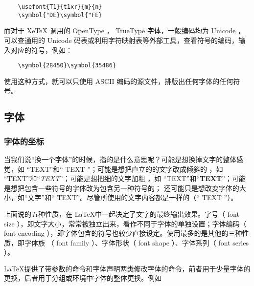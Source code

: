 \begin{minipage}[t]{0.45\textwidth}
\begin{lstlisting}
    \usefont{T1}{t1xr}{m}{n}
    \symbol{"DE}\symbol{"FE}
\end{lstlisting}
\end{minipage}
\hfill
\begin{minipage}[t]{0.45\textwidth}
\end{minipage}

而对于 XeTeX 调用的 OpenType ， TrueType 字体，一般编码均为 Unicode ，可以查通用的 Unicode 码表或利用字符映射表等外部工具，查看符号的编码，输入对应的符号，例如：

\begin{minipage}[t]{0.45\textwidth}
\begin{lstlisting}
    \symbol{28450}\symbol{35486}
\end{lstlisting}
\end{minipage}
\hfill
\begin{minipage}[t]{0.45\textwidth}
\end{minipage}

使用这种方式，就可以只使用 ASCII 编码的源文件，排版出任何字体的任何符号。

\subsection{字体}

\subsubsection{字体的坐标} \label{sec:font}

当我们说“换一个字体”的时候，指的是什么意思呢？可能是想换掉文字的整体感觉，如 “{\ttfamily TEXT}”和“ {\sffamily TEXT} ”；可能是想把直立的的文字改成倾斜的 ，如 “TEXT”和“\textit{TEXT}”；可能是想把细的文字加粗 ，如 “TEXT”和“\textbf{TEXT}”；可能是想把包含一些符号的字体改为包含另一种符号的； 还可能只是想改变字体的大小，如“文字”和“{ TEXT}”。尽管所使用的文字内容都是一样的（“ TEXT ”）。

上面说的五种性质，在 \LaTeX 中一起决定了文字的最终输出效果。字号（ font size ），即文字大小，常常被独立出来，看作不同于字体的单独设置；字体编码（ font encoding ），即字体包含的符号也较少直接设定。使用最多的是其他的三种性质，即字体族 （ font family ）、字体形状（ font shape ）、字体系列（ font series ）。

\LaTeX 提供了带参数的命令和字体声明两类修改字体的命令，前者用于少量字体的更换，后者用于分组或环境中字体的整体更换。例如


